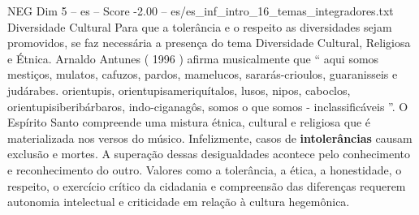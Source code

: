 \begin{textsample}{NEG Dim 5 – es – Score -2.00 – es/es\_inf\_intro\_16\_temas\_integradores.txt}
Diversidade Cultural Para que a tolerância e o respeito as diversidades sejam promovidos, se faz necessária a presença do tema Diversidade Cultural, Religiosa e Étnica.
Arnaldo Antunes ( 1996 ) afirma musicalmente que “ aqui somos mestiços, mulatos, cafuzos, pardos, mamelucos, sararás-crioulos, guaranisseis e judárabes. orientupis, orientupisameriquítalos, lusos, nipos, caboclos, orientupisiberibárbaros, indo-ciganagôs, somos o que somos - inclassificáveis ”.
O Espírito Santo compreende uma mistura étnica, cultural e religiosa que é materializada nos versos do músico.
Infelizmente, casos de \textbf{intolerâncias} causam exclusão e mortes.
A superação dessas desigualdades acontece pelo conhecimento e reconhecimento do outro.
Valores como a tolerância, a ética, a honestidade, o respeito, o exercício crítico da cidadania e compreensão das diferenças requerem autonomia intelectual e criticidade em relação à cultura hegemônica.

\end{textsample}
